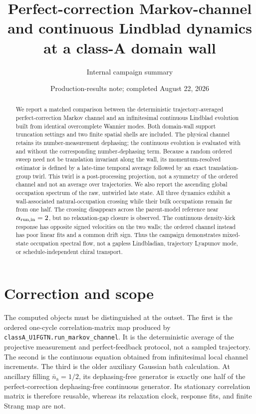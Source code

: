 \documentclass[aps,prb,twocolumn,nofootinbib,superscriptaddress,floatfix]{revtex4-2}
\begin{document}
\title{Perfect-correction Markov-channel and continuous Lindblad dynamics at a class-A domain wall}
\author{Internal campaign summary}
\date{Production-results note; completed August 22, 2026}

\begin{abstract}
We report a matched comparison between the deterministic trajectory-averaged
perfect-correction Markov channel and an infinitesimal continuous Lindblad evolution
built from identical overcomplete Wannier modes.  Both domain-wall support truncation
settings and two finite spatial shells are included.  The physical channel retains its
number-measurement dephasing; the continuous evolution is evaluated with and without
the corresponding number-dephasing term.  Because a random ordered sweep need not be
translation invariant along the wall, its momentum-resolved estimator is defined by a
late-time temporal average followed by an exact translation-group twirl.  This twirl is
a post-processing projection, not a symmetry of the ordered channel and not an average
over trajectories.  We also report the ascending global occupation spectrum of the raw,
untwirled late state.  All three
dynamics exhibit a wall-associated natural-occupation crossing while their bulk
occupations remain far from one half.  The crossing disappears across the parent-model
reference near $\alpha_{\rm run,in}=2$, but no relaxation-gap closure is observed.
The continuous density-kick response has opposite signed velocities on the two walls;
the ordered channel instead has poor linear fits and a common drift sign.  Thus the
campaign demonstrates mixed-state occupation spectral flow, not a gapless Lindbladian,
trajectory Lyapunov mode, or schedule-independent chiral transport.
\end{abstract}

\maketitle

\section{Correction and scope}

The computed objects must be distinguished at the outset.  The first is the ordered
one-cycle correlation-matrix map produced by
\texttt{classA\_U1FGTN.run\_markov\_channel}.  It is the deterministic average of the
projective measurement and perfect-feedback protocol, not a sampled trajectory.  The
second is the continuous equation obtained from infinitesimal local channel increments.
The third is the older auxiliary Gaussian bath calculation.  At ancillary filling
$\bar n_{\mathrm a}=1/2$, its dephasing-free generator is exactly one half of the
perfect-correction dephasing-free continuous generator.  Its stationary correlation
matrix is therefore reusable, whereas its relaxation clock, response fits, and finite
Strang map are not.
\end{document}
